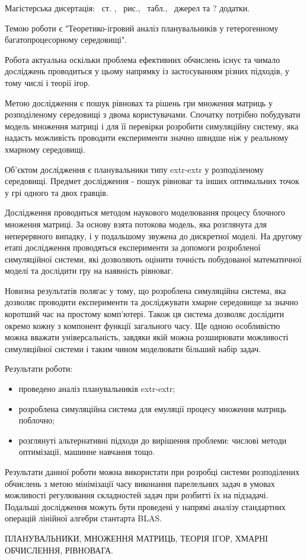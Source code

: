 
Магістерська дисертація: \pageref*{MyLastPage}~ст. , \totfig~рис.,  \tottab~табл., ~джерел та ? додатки.

Темою роботи є "Теоретико-ігровий аналіз планувальників у гетерогенному багатопроцесорному середовищі".

Робота актуальна оскільки проблема ефективних обчислень існує та чимало досліджень проводиться у цьому напрямку із застосуванням різних підходів, у тому числі і теорії ігор.

Метою дослідження є пошук рівновах та рішень гри множення матриць у розподіленому середовищі з двома користувачами. Спочатку потрібно побудувати модель множення матриці і для її перевірки розробити симуляційну систему, яка надасть можливість проводити експерименти значно швидше ніж у реальному хмарному середовищі.

Об'єктом дослідження є планувальники типу extr-extr у розподіленому середовищі. Предмет дослідження - пошук рівноваг та інших оптимальних точок у грі одного та двох гравців.

Дослідження проводиться методом наукового моделювання процесу блочного множення матриці. За основу взята потокова модель, яка розглянута для неперервного випадку, і у подальшому звужена до дискретної моделі. На другому етапі дослідження проводяться експерименти за допомоги розробленої симуляційної системи, які дозволяють оцінити точність побудованої математичної моделі та дослідити гру на наявність рівноваг.

Новизна результатів полягає у тому, що розроблена симуляційна система, яка дозволяє проводити експерименти та досліджувати хмарне середовище за значно коротший час на простому комп'ютері. Також ця система дозволяє дослідити окремо кожну з компонент функції загального часу. Ще одною особливістю можна вважати універсальність, завдяки якій можна розширювати можливості симуляційної системи і таким чином моделювати більший набір задач.

Результати роботи:
\begin{itemize}
	\item проведено аналіз планувальників extr-extr;
	\item розроблена симуляційна система для емуляції процесу множення матриць поблочно;
	\item розглянуті альтернативні підходи до вирішення проблеми: числові методи оптимізації, машинне навчання тощо.
\end{itemize}

Результати данної роботи можна використати при розробці системи розподілених обчислень з метою мінімізації часу виконання парелельних задач в умовах можливості регулювання складностей задач при розбитті їх на підзадачі. Подальші дослідження можуть бути проведені у напрямі аналізу стандартних операцій лінійної алгебри стантарта BLAS.

\MakeUppercase{планувальники, множення матриць, теорія ігор, хмарні обчислення, рівновага.}